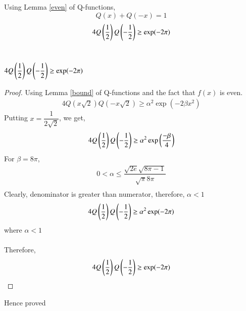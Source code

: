 \documentclass[journal,12pt,twocolumn]{IEEEtran}
\begin{document}
Using Lemma \ref{even} of Q-functions,
\begin{equation}
    Q(x)+Q(-x)=1
\end{equation}
\begin{align}
    4Q\left(\dfrac{1}{2}\right)Q\left(-\dfrac{1}{2}\right)\geq \exp(-2 \pi)
\end{align}
\\
\begin{lemma}\label{3}
$4Q\left(\dfrac{1}{2}\right)Q\left(-\dfrac{1}{2}\right)\geq \exp(-2 \pi)$
\end{lemma}
\begin{proof}
Using Lemma \ref{bound} of Q-functions and the fact that $f(x)$ is even.
\begin{align}
    4Q(x\sqrt{2})Q(-x\sqrt{2}) \geq \alpha^{2}\exp(-2\beta x^{2})
\end{align}
Putting $x=\dfrac{1}{2 \sqrt{2}}$, we get,\\
\begin{align}
    4Q\left(\dfrac{1}{2}\right)Q\left(-\dfrac{1}{2}\right)\geq \alpha^{2}\exp\left(\dfrac{-\beta}{4}\right)
\end{align}
For $\beta = 8\pi$, 
\begin{align}
    0 < \alpha \leq \dfrac{\sqrt{2e}\sqrt{8 \pi-1}}{\sqrt{\pi} 8\pi}\\
\end{align} 
 Clearly, denominator is greater than numerator, therefore, $\alpha < 1$
\begin{align}
    4Q\left(\dfrac{1}{2}\right)Q\left(-\dfrac{1}{2}\right)\geq \alpha^{2}\exp(-2\pi)
\end{align}
where $\alpha < 1$
\\\\
Therefore,
\begin{align}
    4Q\left(\dfrac{1}{2}\right)Q\left(-\dfrac{1}{2}\right)\geq \exp(-2\pi)
\end{align}
\end{proof}
Hence proved
\end{document}
